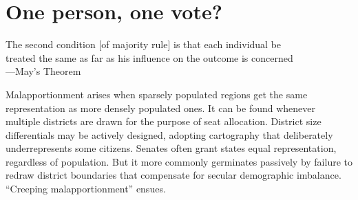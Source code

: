 \documentclass[letter,12pt]{article}
\begin{document}
\section{One person, one vote?}




\singlespacing
\begin{footnotesize}
\begin{center}
The second condition [of majority rule] is that each individual be \\ treated the same as far as his influence on the outcome is concerned \\ ---May's Theorem \citeyearpar{may.1952condsMaj}
\end{center}
\end{footnotesize}
\onehalfspacing

\noindent Malapportionment arises when sparsely populated regions get the same representation as more densely populated ones. It can be found whenever multiple districts are drawn for the purpose of seat allocation. District size differentials may be actively designed, adopting cartography that deliberately underrepresents some citizens. Senates often grant states equal representation, regardless of population. But it more commonly germinates passively by failure to redraw district boundaries that compensate for secular demographic imbalance. ``Creeping malapportionment'' \citep{johnston.2002} ensues. 
\end{document}
